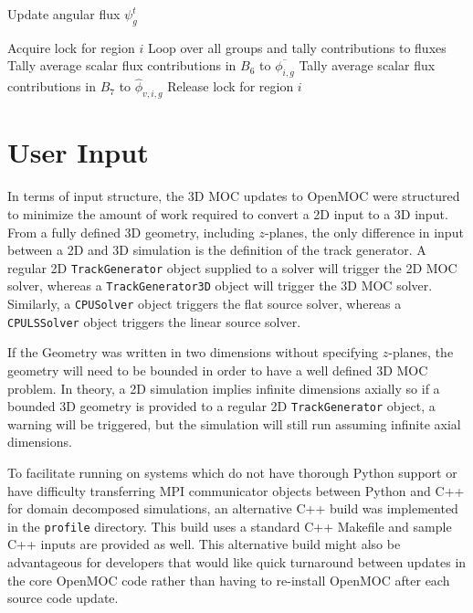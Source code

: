 \begin{algorithm*}[!h]
\begin{algorithmic}
		\State Update angular flux $\psi_g^{t}$ 
		
		\EndFor
		\vspace{0.1in}
		
		\State Acquire lock for region $i$
		 \Comment Loop over all groups and tally contributions to fluxes
		\vspace{0.1in}
		\State Tally average scalar flux contributions in $B_6$ to $\overline{\phi_{i,g}}$ 
		\State Tally average scalar flux contributions in $B_7$ to $\hat{\phi}_{v,i,g}$ 
		\vspace{0.1in}
		\EndFor
		\vspace{0.1in}
		\State Release lock for region $i$
		
	\end{algorithmic}
\end{algorithm*}

\clearpage
\section{User Input}
\label{sec:user-input}

In terms of input structure, the 3D MOC updates to OpenMOC were structured to minimize the amount of work required to convert a 2D input to a 3D input. From a fully defined 3D geometry, including $z$-planes, the only difference in input between a 2D and 3D simulation is the definition of the track generator. A regular 2D \texttt{TrackGenerator} object supplied to a solver will trigger the 2D \ac{MOC} solver, whereas a \texttt{TrackGenerator3D} object will trigger the 3D \ac{MOC} solver. Similarly, a \texttt{CPUSolver} object triggers the flat source solver, whereas a \texttt{CPULSSolver} object triggers the linear source solver.

If the Geometry was written in two dimensions without specifying $z$-planes, the geometry will need to be bounded in order to have a well defined 3D \ac{MOC} problem. In theory, a 2D simulation implies infinite dimensions axially so if a bounded 3D geometry is provided to a regular 2D \texttt{TrackGenerator} object, a warning will be triggered, but the simulation will still run assuming infinite axial dimensions.

To facilitate running on systems which do not have thorough Python support or have difficulty transferring MPI communicator objects between Python and C++ for domain decomposed simulations, an alternative C++ build was implemented in the \texttt{profile} directory. This build uses a standard C++ Makefile and sample C++ inputs are provided as well. This alternative build might also be advantageous for developers that would like quick turnaround between updates in the core OpenMOC code rather than having to re-install OpenMOC after each source code update. 


